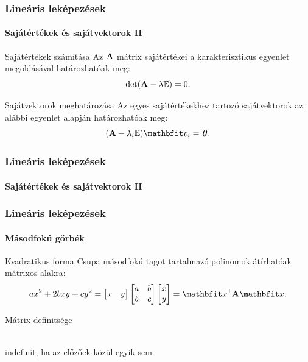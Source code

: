 \documentclass[xcolor={table}]{beamer}
\begin{document}
\begin{frame}
  \frametitle{Lineáris leképezések}
  \framesubtitle{Sajátértékek és sajátvektorok II}

  \begin{block}{Sajátértékek számítása}
    Az $\mathbf{A}$ mátrix sajátértékei a karakterisztikus egyenlet megoldásával
    határozhatóak meg:
    \[
      \det (\mathbf{A} - \lambda {\mathbb{E}}) = 0
      \text.
    \]
  \end{block}

  \begin{block}{Sajátvektorok meghatározása}
    Az egyes sajátértékekhez tartozó sajátvektorok az alábbi egyenlet alapján
    határozhatóak meg:
    \[
      (\rmat A - \lambda_i \imat) \rvec v_i = \nvec
      \text.
    \]
  \end{block}
\end{frame}

\begin{frame}
  \frametitle{Lineáris leképezések}
  \framesubtitle{Sajátértékek és sajátvektorok II}

  
  
\end{frame}


\begin{frame}
  \frametitle{Lineáris leképezések}
  \framesubtitle{Másodfokú görbék}

  \begin{block}{Kvadratikus forma}
    Csupa másodfokú tagot tartalmazó polinomok átírhatóak mátrixos alakra:
    \[
      a x^2 + 2 b x y + c y^2
      =
      \begin{bmatrix} x & y \end{bmatrix}
      \begin{bmatrix} a & b \\ b & c \end{bmatrix}
      \begin{bmatrix} x \\ y \end{bmatrix}
      =
      \rvec x^{\mathsf T} \rmat A \rvec x
      \text.
    \]
  \end{block}

  \begin{block}{Mátrix definitsége}
    \centering
    \\[2mm]
    indefinit, ha az előzőek közül egyik sem
  \end{block}
\end{frame}
\end{document}
